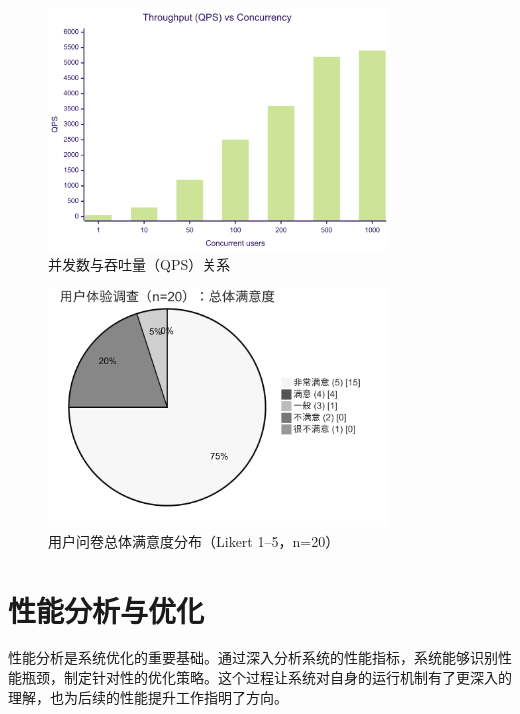 \begin{figure}[H]
  \begin{minipage}{0.48\textwidth}
    \centering
    \includegraphics[width=0.8\textwidth]{chapters/fig-0/performance-qps.png}
    \caption{并发数与吞吐量（QPS）关系}
    \label{fig:perf-qps}
  \end{minipage}
\end{figure}

\begin{figure}[H]
  \centering
  \includegraphics[width=0.8\textwidth]{chapters/fig-0/survey-satisfaction.png}
  \caption{用户问卷总体满意度分布（Likert 1--5，n=20）}
  \label{fig:survey-satisfaction}
\end{figure}

\section{性能分析与优化}

性能分析是系统优化的重要基础。通过深入分析系统的性能指标，系统能够识别性能瓶颈，制定针对性的优化策略。这个过程让系统对自身的运行机制有了更深入的理解，也为后续的性能提升工作指明了方向。


